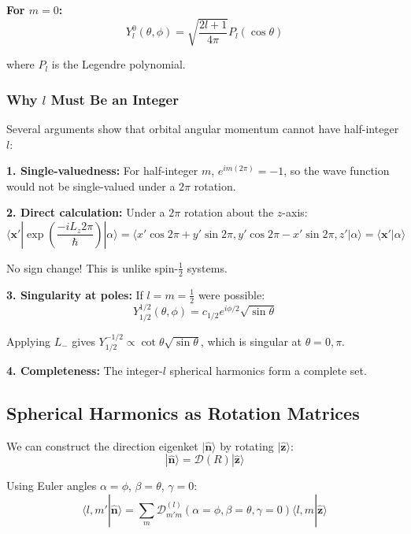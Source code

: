 \documentclass[11pt,a4paper]{article}
\begin{document}
\textbf{For $m = 0$:}
\begin{equation}
Y_l^0(\theta, \phi) = \sqrt{\frac{2l+1}{4\pi}}P_l(\cos\theta)
\tag{3.248}
\end{equation}

where $P_l$ is the Legendre polynomial.

\subsubsection{Why $l$ Must Be an Integer}

Several arguments show that orbital angular momentum cannot have half-integer $l$:

\textbf{1. Single-valuedness:} For half-integer $m$, $e^{im(2\pi)} = -1$, so the wave function would not be single-valued under a $2\pi$ rotation.

\textbf{2. Direct calculation:} Under a $2\pi$ rotation about the $z$-axis:
\begin{equation}
\langle\mathbf{x}'|\exp\left(\frac{-iL_z 2\pi}{\hbar}\right)|\alpha\rangle = \langle x'\cos 2\pi + y'\sin 2\pi, y'\cos 2\pi - x'\sin 2\pi, z'|\alpha\rangle = \langle\mathbf{x}'|\alpha\rangle
\tag{3.250}
\end{equation}

No sign change! This is unlike spin-$\frac{1}{2}$ systems.

\textbf{3. Singularity at poles:} If $l = m = \frac{1}{2}$ were possible:
\begin{equation}
Y_{1/2}^{1/2}(\theta, \phi) = c_{1/2}e^{i\phi/2}\sqrt{\sin\theta}
\tag{3.251}
\end{equation}

Applying $L_-$ gives $Y_{1/2}^{-1/2} \propto \cot\theta\sqrt{\sin\theta}$, which is singular at $\theta = 0, \pi$.

\textbf{4. Completeness:} The integer-$l$ spherical harmonics form a complete set.

\subsection{Spherical Harmonics as Rotation Matrices}

We can construct the direction eigenket $|\hat{\mathbf{n}}\rangle$ by rotating $|\hat{\mathbf{z}}\rangle$:
\begin{equation}
|\hat{\mathbf{n}}\rangle = \mathscr{D}(R)|\hat{\mathbf{z}}\rangle
\tag{3.255}
\end{equation}

Using Euler angles $\alpha = \phi$, $\beta = \theta$, $\gamma = 0$:
\begin{equation}
\langle l, m'|\hat{\mathbf{n}}\rangle = \sum_m \mathscr{D}_{m'm}^{(l)}(\alpha = \phi, \beta = \theta, \gamma = 0)\langle l, m|\hat{\mathbf{z}}\rangle
\tag{3.258}
\end{equation}
\end{document}
